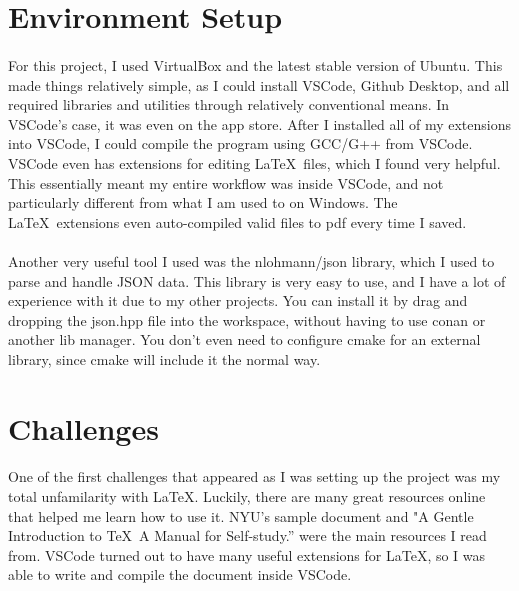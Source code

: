 \documentclass[12pt]{article}
\begin{document}
\section{Environment Setup}

\paragraph{}
For this project, I used VirtualBox and the latest stable version of Ubuntu.
This made things relatively simple, as I could install VSCode, Github Desktop, and all required libraries and utilities through relatively conventional means.
In VSCode's case, it was even on the app store.
After I installed all of my extensions into VSCode, I could compile the program using GCC/G++ from VSCode.
VSCode even has extensions for editing \LaTeX\ files, which I found very helpful.
This essentially meant my entire workflow was inside VSCode, and not particularly different from what I am used to on Windows.
The \LaTeX\  extensions even auto-compiled valid files to pdf every time I saved.

\paragraph{}
Another very useful tool I used was the nlohmann/json library, which I used to parse and handle JSON data.
This library is very easy to use, and I have a lot of experience with it due to my other projects.
You can install it by drag and dropping the json.hpp file into the workspace, without having to use conan or another lib manager. 
You don't even need to configure cmake for an external library, since cmake will include it the normal way.

\section{Challenges}

\paragraph{}
One of the first challenges that appeared as I was setting up the project was my total unfamilarity with \LaTeX. 
Luckily, there are many great resources online that helped me learn how to use it.
NYU's sample document\cite{1} and "A Gentle Introduction to \TeX\ A Manual for Self-study.”\cite{2} were the main resources I read from.
VSCode turned out to have many useful extensions for \LaTeX, so I was able to write and compile the document inside VSCode.
\end{document}
